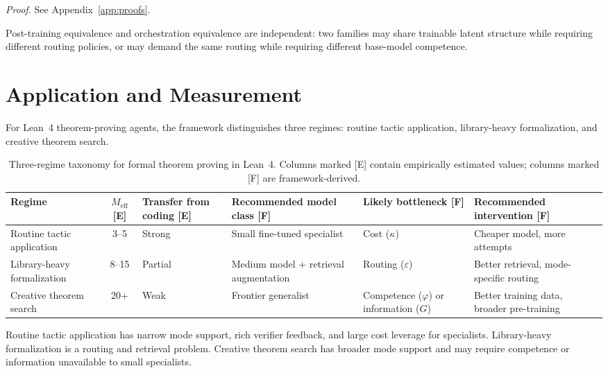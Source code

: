 \documentclass[10pt]{article}
\theoremstyle{paperplain}
\theoremstyle{paperdefinition}
\theoremstyle{paperremark}
\newcommand{\Meff}{M_{\mathrm{eff}}}
\begin{document}
\par\noindent\emph{Proof.} See Appendix~\ref{app:proofs}.\par

Post-training equivalence and orchestration equivalence are independent: two families may share trainable latent structure while requiring different routing policies, or may demand the same routing while requiring different base-model competence.

\section{Application and Measurement}
\label{sec:application}
\label{sec:measurement}

For Lean~4 theorem-proving agents, the framework distinguishes three regimes: routine tactic application, library-heavy formalization, and creative theorem search.

\begin{table}[h]
\centering
\small
\caption{Three-regime taxonomy for formal theorem proving in Lean~4. Columns marked \textup{[E]} contain empirically estimated values; columns marked \textup{[F]} are framework-derived.}
\label{tab:regime-taxonomy}
\begin{tabular}{@{}L{2.6cm}cL{2.0cm}L{2.6cm}L{2.4cm}L{2.8cm}@{}}
\toprule
\textbf{Regime} & \textbf{$\Meff$ [E]} & \textbf{Transfer from coding [E]} & \textbf{Recommended model class [F]} & \textbf{Likely bottleneck [F]} & \textbf{Recommended intervention [F]} \\
\midrule
Routine tactic application & 3--5 & Strong & Small fine-tuned specialist & Cost ($\kappa$) & Cheaper model, more attempts \\
Library-heavy formalization & 8--15 & Partial & Medium model + retrieval augmentation & Routing ($\varepsilon$) & Better retrieval, mode-specific routing \\
Creative theorem search & 20+ & Weak & Frontier generalist & Competence ($\varphi$) or information ($G$) & Better training data, broader pre-training \\
\bottomrule
\end{tabular}
\end{table}

Routine tactic application has narrow mode support, rich verifier feedback, and large cost leverage for specialists. Library-heavy formalization is a routing and retrieval problem. Creative theorem search has broader mode support and may require competence or information unavailable to small specialists.
\end{document}
